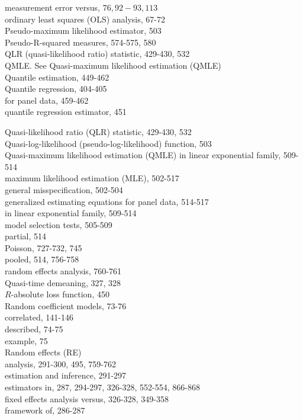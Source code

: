 \documentclass[10pt]{article}
\begin{document}
measurement error versus, $76,92-93,113$\\
ordinary least squares (OLS) analysis, 67-72\\
Pseudo-maximum likelihood estimator, 503\\
Pseudo-R-squared measures, 574-575, 580\\
QLR (quasi-likelihood ratio) statistic, 429-430, 532\\
QMLE. See Quasi-maximum likelihood estimation (QMLE)\\
Quantile estimation, 449-462\\
Quantile regression, 404-405\\
for panel data, 459-462\\
quantile regression estimator, 451

Quasi-likelihood ratio (QLR) statistic, 429-430, 532\\
Quasi-log-likelihood (pseudo-log-likelihood) function, 503\\
Quasi-maximum likelihood estimation (QMLE) in linear exponential family, 509-514\\
maximum likelihood estimation (MLE), 502-517\\
general misspecification, 502-504\\
generalized estimating equations for panel data, 514-517\\
in linear exponential family, 509-514\\
model selection tests, 505-509\\
partial, 514\\
Poisson, 727-732, 745\\
pooled, 514, 756-758\\
random effects analysis, 760-761\\
Quasi-time demeaning, 327, 328\\
$R$-absolute loss function, 450\\
Random coefficient models, 73-76\\
correlated, 141-146\\
described, 74-75\\
example, 75\\
Random effects (RE)\\
analysis, 291-300, 495, 759-762\\
estimation and inference, 291-297\\
estimators in, 287, 294-297, 326-328, 552-554, 866-868\\
fixed effects analysis versus, 326-328, 349-358\\
framework of, 286-287\\
\end{document}
